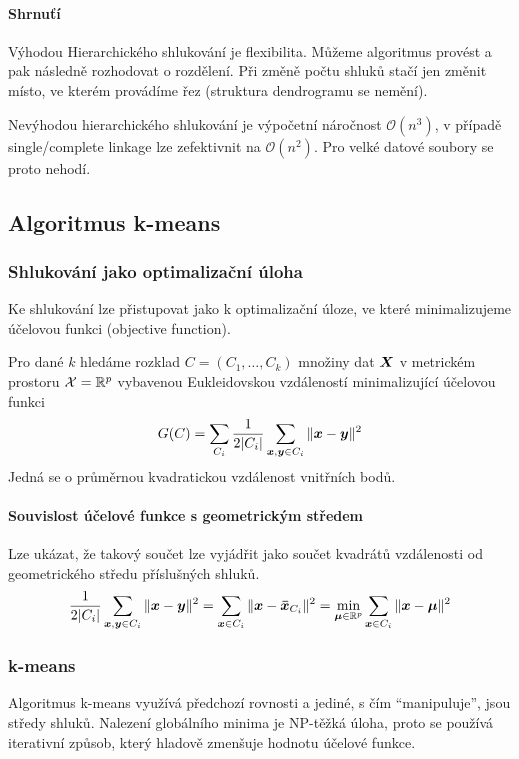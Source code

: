 \paragraph{Shrnuťí} Výhodou Hierarchického shlukování je flexibilita. Můžeme algoritmus provést a pak následně rozhodovat o rozdělení. Při změně počtu shluků stačí jen změnit místo, ve kterém provádíme řez (struktura dendrogramu se nemění).

Nevýhodou hierarchického shlukování je výpočetní náročnost $\mathcal{O}(n^3)$, v případě single/complete linkage lze zefektivnit na $\mathcal{O}(n^2)$. Pro velké datové soubory se proto nehodí.

\subsection{Algoritmus k-means}

\subsubsection{Shlukování jako optimalizační úloha}

Ke shlukování lze přistupovat jako k optimalizační úloze, ve které minimalizujeme účelovou funkci (objective function).

Pro dané $k$ hledáme rozklad $C = (C_1, \ldots, C_k)$ množiny dat $\bm{X}$ v metrickém prostoru $\mathcal{X} = \mathbb{R}^p$ vybavenou Eukleidovskou vzdáleností minimalizující účelovou funkci
\[
    G(C) = \sum_{C_i} \frac{1}{2 |C_i|} \sum_{\bm{x}, \bm{y} \in C_i} \|\bm{x} - \bm{y}\|^2
\]
Jedná se o průměrnou kvadratickou vzdálenost vnitřních bodů.

\paragraph{Souvislost účelové funkce s geometrickým středem}
Lze ukázat, že takový součet lze vyjádřit jako součet kvadrátů vzdálenosti od geometrického středu příslušných shluků.
\[
    \frac{1}{2 |C_i|} \sum_{\bm{x}, \bm{y} \in C_i} \|\bm{x} - \bm{y}\|^2
    = \sum_{\bm{x} \in C_i} \|\bm{x} - \bm{\bar{x}}_{C_i}\|^2
    = \min_{\bm{\mu} \in \mathbb{R}^p} \sum_{\bm{x} \in C_i} \|\bm{x} - \bm{\mu}\|^2
\]

\subsubsection{k-means}

Algoritmus k-means využívá předchozí rovnosti a jediné, s čím ``manipuluje'', jsou středy shluků. Nalezení globálního minima je NP-těžká úloha, proto se používá iterativní způsob, který hladově zmenšuje hodnotu účelové funkce.

